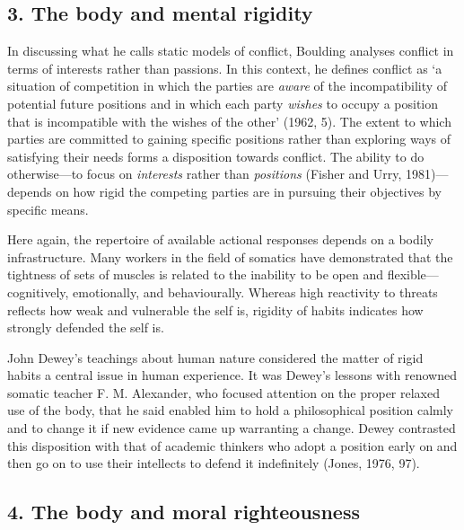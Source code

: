 \subsection*{3. The body and mental rigidity}

In discussing what he calls static models of conflict, Boulding analyses conflict in terms of interests rather than passions. In this context, he defines conflict as `a situation of competition in which the parties are \emph{aware} of the incompatibility of potential future positions and in which each party \emph{wishes} to occupy a position that is incompatible with the wishes of the other' (1962, 5). The extent to which parties are committed to gaining specific positions rather than exploring ways of satisfying their needs forms a disposition towards conflict. The ability to do otherwise---to focus on \emph{interests} rather than \emph{positions} (Fisher and Urry, 1981)---depends on how rigid the competing parties are in pursuing their objectives by specific means.

Here again, the repertoire of available actional responses depends on a bodily infrastructure. Many workers in the field of somatics have demonstrated that the tightness of sets of muscles is related to the inability to be open and flexible---cognitively, emotionally, and behaviourally. Whereas high reactivity to threats reflects how weak and vulnerable the self is, rigidity of habits indicates how strongly defended the self is.

John Dewey's teachings about human nature considered the matter of rigid habits a central issue in human experience. It was Dewey's lessons with renowned somatic teacher F. M. Alexander, who focused attention on the proper relaxed use of the body, that he said enabled him to hold a philosophical position calmly and to change it if new evidence came up warranting a change. Dewey contrasted this disposition with that of academic thinkers who adopt a position early on and then go on to use their intellects to defend it indefinitely (Jones, 1976, 97).

\subsection*{4. The body and moral righteousness}

